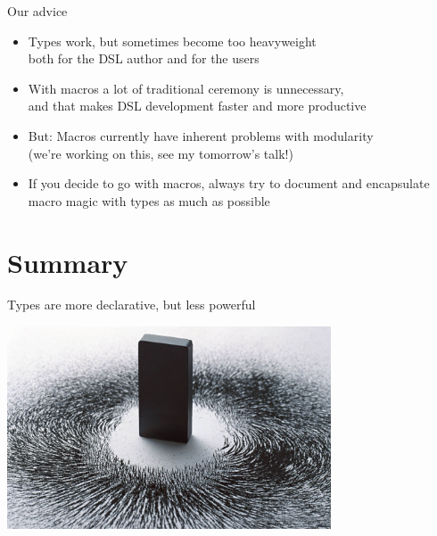 \documentclass[compress,xcolor={usenames,dvipsnames,table}]{beamer}
\begin{document}
\begin{frame}{Our advice}
  \begin{itemize}
    \item Types work, but sometimes become too heavyweight\\
          both for the DSL author and for the users
    \item With macros a lot of traditional ceremony is unnecessary,\\
          and that makes DSL development faster and more productive
    \item But: Macros currently have inherent problems with modularity\\
          (we're working on this, see my tomorrow's talk!)
    \item If you decide to go with macros, always try to document and encapsulate
          macro magic with types as much as possible
  \end{itemize}
\end{frame}

  \section{Summary}

\begin{frame}[fragile]{Types are more declarative, but less powerful}
  \begin{center}
    \includegraphics[height=6cm]{img/magnet.jpg}
  \end{center}
\end{frame}
\end{document}
